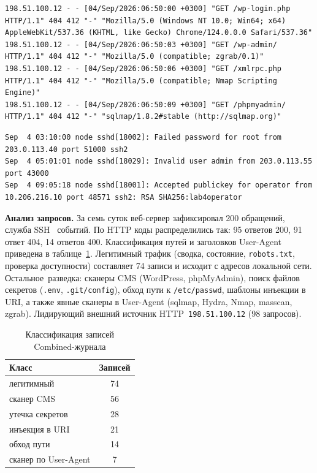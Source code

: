 \begin{lstlisting}[caption={Фрагмент Combined-журнала веб-сервера},label={lst:http},basicstyle=\footnotesize\ttfamily]
198.51.100.12 - - [04/Sep/2026:06:50:00 +0300] "GET /wp-login.php HTTP/1.1" 404 412 "-" "Mozilla/5.0 (Windows NT 10.0; Win64; x64) AppleWebKit/537.36 (KHTML, like Gecko) Chrome/124.0.0.0 Safari/537.36"
198.51.100.12 - - [04/Sep/2026:06:50:03 +0300] "GET /wp-admin/ HTTP/1.1" 404 412 "-" "Mozilla/5.0 (compatible; zgrab/0.1)"
198.51.100.12 - - [04/Sep/2026:06:50:06 +0300] "GET /xmlrpc.php HTTP/1.1" 404 412 "-" "Mozilla/5.0 (compatible; Nmap Scripting Engine)"
198.51.100.12 - - [04/Sep/2026:06:50:09 +0300] "GET /phpmyadmin/ HTTP/1.1" 404 412 "-" "sqlmap/1.8.2#stable (http://sqlmap.org)"
\end{lstlisting}

\pagebreak
\begin{lstlisting}[caption={Фрагмент журнала SSH},label={lst:ssh},basicstyle=\footnotesize\ttfamily]
Sep  4 03:10:00 node sshd[18002]: Failed password for root from 203.0.113.40 port 51000 ssh2
Sep  4 05:01:01 node sshd[18029]: Invalid user admin from 203.0.113.55 port 43000
Sep  4 09:05:18 node sshd[18001]: Accepted publickey for operator from 10.206.216.10 port 48571 ssh2: RSA SHA256:lab4operator
\end{lstlisting}

\textbf{Анализ запросов.}
За семь суток веб-сервер зафиксировал 200 обращений, служба SSH~ событий. По HTTP коды распределились так: 95 ответов 200, 91 ответ 404, 14 ответов 400. Классификация путей и заголовков User-Agent приведена в таблице~\ref{tab:httpcls}. Легитимный трафик (сводка, состояние, \texttt{robots.txt}, проверка доступности) составляет 74 записи и исходит с адресов локальной сети. Остальное~\mdash  разведка: сканеры CMS (WordPress, phpMyAdmin), поиск файлов секретов (\texttt{.env}, \texttt{.git/config}), обход пути к \texttt{/etc/passwd}, шаблоны инъекции в URI, а также явные сканеры в User-Agent (sqlmap, Hydra, Nmap, masscan, zgrab). Лидирующий внешний источник HTTP~\mdash  \texttt{198.51.100.12} (98 запросов).

\begin{table}[H]
	\centering
	\begin{tabular}{|l|c|}
		\hline
		\textbf{Класс} & \textbf{Записей} \\
		\hline
		легитимный & 74 \\
		\hline
		сканер CMS & 56 \\
		\hline
		утечка секретов & 28 \\
		\hline
		инъекция в URI & 21 \\
		\hline
		обход пути & 14 \\
		\hline
		сканер по User-Agent & 7 \\
		\hline
	\end{tabular}
	\caption{Классификация записей Combined-журнала}
	\label{tab:httpcls}
\end{table}

